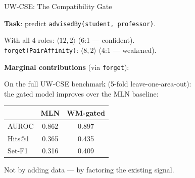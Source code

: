 \documentclass[aspectratio=169,11pt]{beamer}
\begin{document}
\begin{frame}{UW-CSE: The Compatibility Gate}

\textbf{Task}: predict \texttt{advisedBy(student, professor)}.

\medskip
With all 4 roles: $\langle 12, 2 \rangle$ \quad (6:1 --- confident).\\
\texttt{forget(PairAffinity)}: $\langle 8, 2 \rangle$ \quad
(4:1 --- weakened).

\medskip
\textbf{Marginal contributions} (via \texttt{forget}):

\begin{center}
\end{center}

\smallskip
On the full UW-CSE benchmark (5-fold leave-one-area-out):\\
the gated model improves over the MLN baseline:

\smallskip
{\small
\begin{tabular}{lcc}
& MLN & WM-gated \\
\midrule
AUROC & 0.862 & \alert{0.897} \\
Hits@1 & 0.365 & \alert{0.435} \\
Set-F1 & 0.316 & \alert{0.409} \\
\end{tabular}}

\smallskip
Not by adding data --- by \alert{factoring} the existing signal.

\end{frame}
\end{document}
